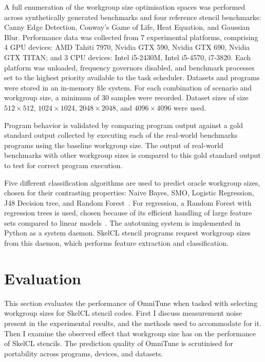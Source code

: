 \documentclass[nonatbib,preprint,9pt]{sigplanconf}
\begin{document}
A full enumeration of the workgroup size optimisation spaces was
performed across synthetically generated benchmarks and four reference
stencil benchmarks: Canny Edge Detection, Conway's Game of Life, Heat
Equation, and Gaussian Blur. Performance data was collected from 7
experimental platforms, comprising 4 GPU devices: AMD Tahiti 7970,
Nvidia GTX 590, Nvidia GTX 690, Nvidia GTX TITAN; and 3 CPU devices:
Intel i5-2430M, Intel i5-4570, i7-3820.  Each platform was unloaded,
frequency governors disabled, and benchmark processes set to the
highest priority available to the task scheduler. Datasets and
programs were stored in an in-memory file system. For each combination
of scenario and workgroup size, a minimum of 30 samples were
recorded. Dataset sizes of size $512\times512$, $1024\times1024$,
$2048\times2048$, and $4096\times4096$ were used.

Program behavior is validated by comparing program output against a
gold standard output collected by executing each of the real-world
benchmarks programs using the baseline workgroup size. The output of
real-world benchmarks with other workgroup sizes is compared to this
gold standard output to test for correct program execution.

Five different classification algorithms are used to predict oracle
workgroup sizes, chosen for their contrasting properties: Naive Bayes,
SMO, Logistic Regression, J48 Decision tree, and Random
Forest~\cite{Han2011}. For regression, a Random Forest with regression
trees is used, chosen because of its efficient handling of large
feature sets compared to linear models~\cite{Breiman1999}. The
autotuning system is implemented in Python as a system daemon. SkelCL
stencil programs request workgroup sizes from this daemon, which
performs feature extraction and classification.


\section{Evaluation}\label{sec:evaluation}

This section evaluates the performance of OmniTune when tasked with
selecting workgroup sizes for SkelCL stencil codes. First I discuss
measurement noise present in the experimental results, and the methods
used to accommodate for it. Then I examine the observed effect that
workgroup size has on the performance of SkelCL stencils. The
prediction quality of OmniTune is scrutinised for portability across
programs, devices, and datasets.
\end{document}
